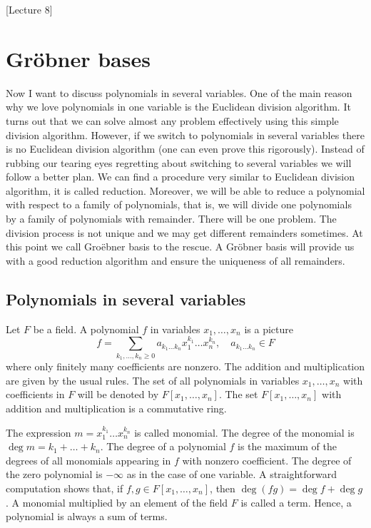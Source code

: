 [Lecture 8]


\section{Gr\"obner bases}

Now I want to discuss polynomials in several variables.
One of the main reason why we love polynomials in one variable is the Euclidean division algorithm.
It turns out that we can solve almost any problem effectively using this simple division algorithm.
However, if we switch to polynomials in several variables there is no Euclidean division algorithm (one can even prove this rigorously).
Instead of rubbing our tearing eyes regretting about switching to several variables we will follow a better plan.
We can find a procedure very similar to Euclidean division algorithm, it is called reduction.
Moreover, we will be able to reduce a polynomial with respect to a family of polynomials, that is, we will divide one polynomials by a family of polynomials with remainder.
There will be one problem.
The division process is not unique and we may get different remainders sometimes.
At this point we call Gro\"ebner basis to the rescue.
A Gr\"obner basis will provide us with a good reduction algorithm and ensure the uniqueness of all remainders.

\subsection{Polynomials in several variables}

Let $F$ be a field.
A polynomial $f$ in variables $x_1,\ldots,x_n$ is a picture
\[
f = \sum_{k_1,\ldots,k_n\geqslant 0} a_{k_1\ldots k_n} x_1^{k_1} \ldots x_n^{k_n},\quad a_{k_1\ldots k_n} \in F
\]
where only finitely many coefficients are nonzero.
The addition and multiplication are given by the usual rules.
The set of all polynomials in variables $x_1,\ldots,x_n$ with coefficients in $F$ will be denoted by $F[x_1,\ldots,x_n]$.
The set $F[x_1,\ldots,x_n]$ with addition and multiplication is a commutative ring.

The expression $m = x_1^{k_1}\ldots x_n^{k_n}$ is called monomial.
The degree of the monomial is $\deg m = k_1+ \ldots + k_n$.
The degree of a polynomial $f$ is the maximum of the degrees of all monomials appearing in $f$ with nonzero coefficient.
The degree of the zero polynomial is $-\infty$ as in the case of one variable.
A straightforward computation shows that, if $f,g\in F[x_1,\ldots,x_n]$, then $\deg(fg) = \deg f + \deg g$.
A monomial multiplied by an element of the field $F$ is called a term.
Hence, a polynomial is always a sum of terms.

